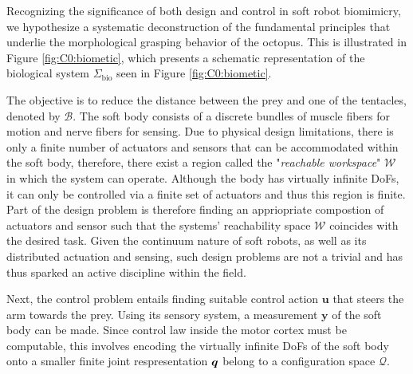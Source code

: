Recognizing the significance of both design and control in soft robot biomimicry, we hypothesize a systematic deconstruction of the fundamental principles that underlie the morphological grasping behavior of the octopus. This is illustrated in Figure \ref{fig:C0:biometic}, which presents a schematic representation of the biological system $\Sigma_{\textrm{bio}}$ seen in Figure \ref{fig:C0:biometic}. 

The objective is to reduce the distance between the prey and one of the tentacles, denoted by $\mathcal{B}$. The soft body consists of a discrete bundles of muscle fibers for motion and nerve fibers for sensing. Due to physical design limitations, there is only a finite number of actuators and sensors that can be accommodated within the soft body, therefore, there exist a region called the "\textit{reachable workspace}" $\mathcal{W}$ in which the system can operate. Although the body has virtually infinite DoFs, it can only be controlled via a finite set of actuators and thus this region is finite. Part of the design problem is therefore finding an appriopriate compostion of actuators and sensor such that the systems' reachability space $\mathcal{W}$ coincides with the desired task. Given the continuum nature of soft robots, as well as its distributed actuation and sensing, such design problems are not a trivial and has thus sparked an active discipline within the field.

Next, the control problem entails finding suitable control action $\textbf{u}$ that steers the arm towards the prey. Using its sensory system, a measurement $\textbf{y}$ of the soft body can be made. Since control law inside the motor cortex must be computable, this involves encoding the virtually infinite DoFs of the soft body onto a smaller finite joint respresentation ${\boldsymbol{q}}$ belong to a configuration space $\mathcal{Q}$.
